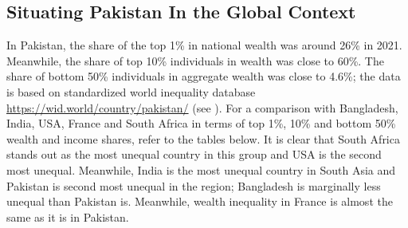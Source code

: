 \documentclass[12pt]{article}
\newcommand{\1}{\mathbbm 1}
\begin{document}
	
	
	
	
	
	
	

     \subsection{Situating Pakistan In the Global Context}
	
	In Pakistan, the share of the top 1\% in national wealth was around 26\% in 2021. Meanwhile, the share of top 10\% individuals in wealth was close to 60\%. The share of bottom 50\% individuals in aggregate wealth was close to 4.6\%; the data is based on standardized world inequality database \url{https://wid.world/country/pakistan/} (see \cite{solt2016standardized}). For a comparison with Bangladesh, India, USA, France and South Africa in terms of top 1\%, 10\% and bottom 50\% wealth and income shares, refer to the tables below. It is clear that South Africa stands out as the most unequal country in this group and USA is the second most unequal. Meanwhile, India is the most unequal country in South Asia and Pakistan is second most unequal in the region; Bangladesh is marginally less unequal than Pakistan is. Meanwhile, wealth inequality in France is almost the same as it is in Pakistan. 
	
	
	
	
	
	
	
	
	
	
	
\end{document}
